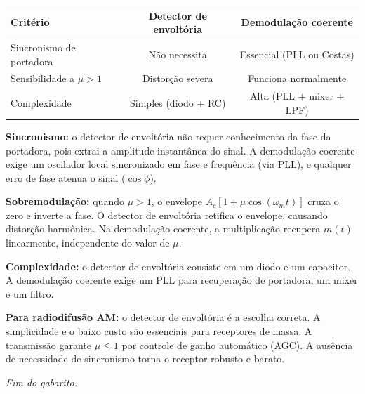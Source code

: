\documentclass[11pt,a4paper]{article}
\begin{document}
\begin{resolucao}

\begin{center}
\small
\begin{tabular}{lcc}
  \toprule
  Critério & Detector de envoltória & Demodulação coerente \\
  \midrule
  Sincronismo de portadora & Não necessita & Essencial (PLL ou Costas) \\
  Sensibilidade a $\mu > 1$ & Distorção severa & Funciona normalmente \\
  Complexidade & Simples (diodo + RC) & Alta (PLL + mixer + LPF) \\
  \bottomrule
\end{tabular}
\end{center}

\textbf{Sincronismo:} o detector de envoltória não requer conhecimento da fase da portadora, pois extrai a amplitude instantânea do sinal. A demodulação coerente exige um oscilador local sincronizado em fase e frequência (via PLL), e qualquer erro de fase atenua o sinal ($\cos\phi$).

\textbf{Sobremodulação:} quando $\mu > 1$, o envelope $A_c[1 + \mu\cos(\omega_m t)]$ cruza o zero e inverte a fase. O detector de envoltória retifica o envelope, causando distorção harmônica. Na demodulação coerente, a multiplicação recupera $m(t)$ linearmente, independente do valor de $\mu$.

\textbf{Complexidade:} o detector de envoltória consiste em um diodo e um capacitor. A demodulação coerente exige um PLL para recuperação de portadora, um mixer e um filtro.

\textbf{Para radiodifusão AM:} o detector de envoltória é a escolha correta. A simplicidade e o baixo custo são essenciais para receptores de massa. A transmissão garante $\mu \leq 1$ por controle de ganho automático (AGC). A ausência de necessidade de sincronismo torna o receptor robusto e barato.
\end{resolucao}


\vfill
\begin{center}
  \small\textit{Fim do gabarito.}
\end{center}
\end{document}
